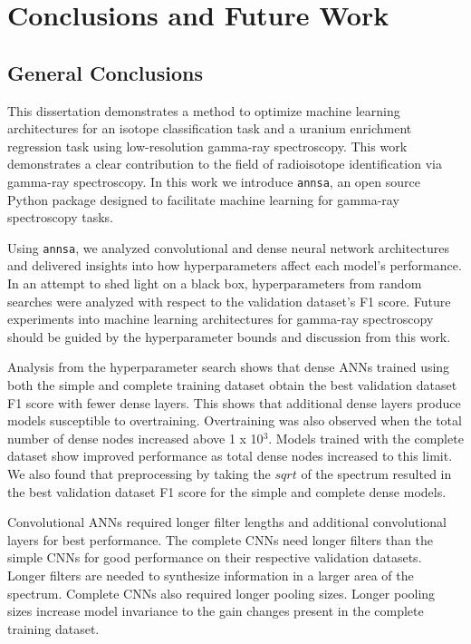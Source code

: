 \chapter{Conclusions and Future Work} \label{conclusion}

\section{General Conclusions}

This dissertation demonstrates a method to optimize machine learning architectures for an isotope classification task and a uranium enrichment regression task using low-resolution gamma-ray spectroscopy. This work demonstrates a clear contribution to the field of radioisotope identification via gamma-ray spectroscopy. In this work we introduce \verb|annsa|, an open source Python package designed to facilitate machine learning for gamma-ray spectroscopy tasks. 

Using \verb|annsa|, we analyzed convolutional and dense neural network architectures and delivered insights into how hyperparameters affect each model's performance. In an attempt to shed light on a black box, hyperparameters from random searches were analyzed with respect to the validation dataset's F1 score. Future experiments into machine learning architectures for gamma-ray spectroscopy should be guided by the hyperparameter bounds and discussion from this work.

Analysis from the hyperparameter search shows that dense ANNs trained using both the simple and complete training dataset obtain the best validation dataset F1 score with fewer dense layers. This shows that additional dense layers produce models susceptible to overtraining. Overtraining was also observed when the total number of dense nodes increased above 1 x 10$^{3}$. Models trained with the complete dataset show improved performance as total dense nodes increased to this limit. We also found that preprocessing by taking the $sqrt$ of the spectrum resulted in the best validation dataset F1 score for the simple and complete dense models. 

Convolutional ANNs required longer filter lengths and additional convolutional layers for best performance. The complete CNNs need longer filters than the simple CNNs for good performance on their respective validation datasets. Longer filters are needed to synthesize information in a larger area of the spectrum. Complete CNNs also required longer pooling sizes. Longer pooling sizes increase model invariance to the gain changes present in the complete training dataset.

